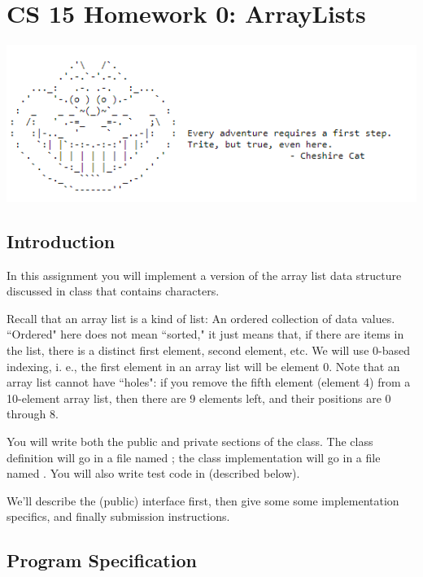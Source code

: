 \documentclass[11pt]{report}
\begin{document}
\chapter*{CS 15 Homework 0: ArrayLists}
\includegraphics[scale=1.25]{cheshireCat.png}

\section*{Introduction}
In this assignment you will implement a version of the array list data
structure discussed in class that contains characters.

Recall that an array list is a kind of list: An ordered collection of
data values.  ``Ordered" here does not mean ``sorted," it just means that,
if there are items in the list, there is a distinct first element,
second element, etc.  We will use 0-based indexing, i. e., the first
element in an array list will be element 0.  Note that an array list
cannot have ``holes": if you remove the fifth element (element 4) from a
10-element array list, then there are 9 elements left, and their
positions are 0 through 8.

You will write both the public and private sections of the 
class.  The class definition will go in a file named  ;
the class implementation will go in a file named .  You
will also write test code in  (described below).

We'll describe the (public) interface first, then give some some
implementation specifics, and finally submission instructions.

\section*{Program Specification}
\end{document}
